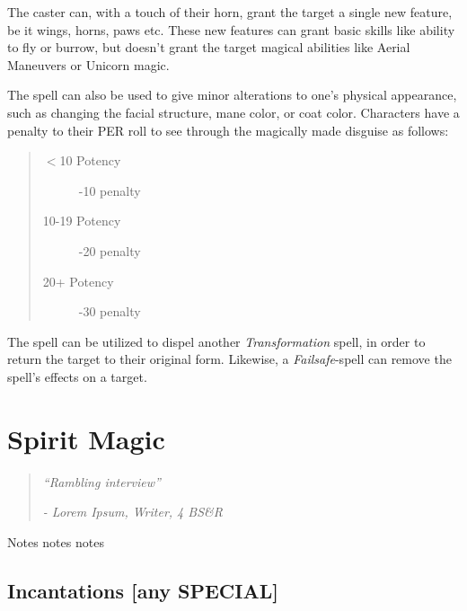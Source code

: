 \documentclass[11pt,a4paper,twocolumn]{book}
\begin{document}
The caster can, with a touch of their horn, grant the target a single new feature, be it wings, horns, paws etc. These new features can grant basic skills like ability to fly or burrow, but doesn't grant the target magical abilities like Aerial Maneuvers or Unicorn magic.

The spell can also be used to give minor alterations to one's physical appearance, such as changing the facial structure, mane color, or coat color. Characters have a penalty to their PER roll to see through the magically made disguise as follows:

\begin{quote}
	\begin{description}
		\item[$<$10 Potency] 	-10 penalty
		\item[10-19 Potency] 	-20 penalty
		\item[20+ Potency] 		-30 penalty
	\end{description}
\end{quote}

The spell can be utilized to dispel another \textit{Transformation} spell, in order to return the target to their original form. Likewise, a \textit{Failsafe}-spell can remove the spell's effects on a target.

\vfill


\chapter{Spirit Magic}

\begin{quote}
	\emph{``Rambling interview''}
	
	\emph{- Lorem Ipsum, Writer, 4 BS\&R}
\end{quote}

Notes notes notes

\section*{Incantations [any SPECIAL]}
\end{document}
